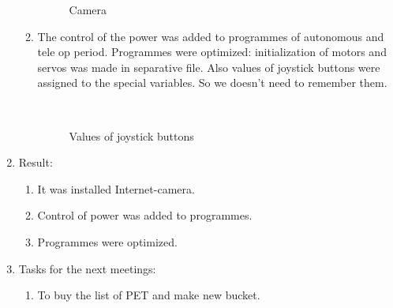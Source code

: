\begin{enumerate}
\begin{enumerate}
\begin{figure}[H]
\begin{minipage}[h]{0.6\linewidth}
		 		         		\caption{Camera}
		 		         	\end{minipage}
		 		         \end{figure}				
		\item The control of the power was added to programmes of autonomous and tele op period. Programmes were optimized: initialization of motors and servos was made in separative file. Also values of joystick buttons were assigned to the special variables. So we doesn't need to remember them.	
		 		         \begin{figure}[H]
		 		         	\begin{minipage}[h]{0.2\linewidth}
		 		         		\center  
		 		         	\end{minipage}
		 		         	\begin{minipage}[h]{0.6\linewidth}
		 		         		\caption{Values of joystick buttons}
		 		         	\end{minipage}
		 		         \end{figure}			 		         
    \end{enumerate}
    
	\item Result: 
	\begin{enumerate}
	  \item It was installed Internet-camera.
	  
	  \item Control of power was added to programmes.
	  
	  \item Programmes were optimized.
      
    \end{enumerate}
    
	\item Tasks for the next meetings:
	\begin{enumerate}
	  \item To buy the list of PET and make new bucket.
    \end{enumerate}     
\end{enumerate}
\fillpage
